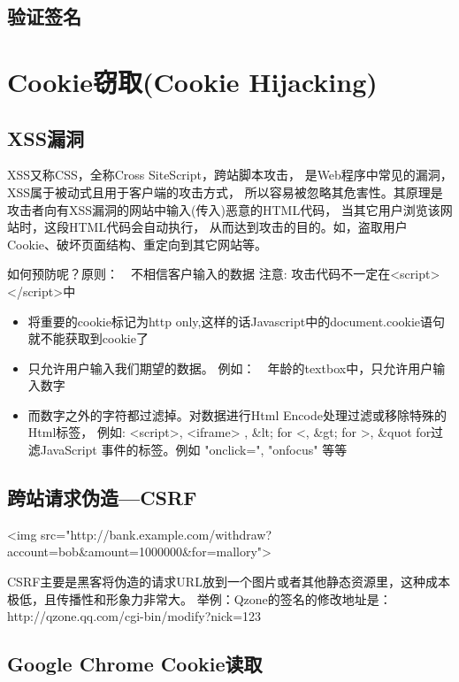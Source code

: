 \documentclass{book}
\begin{document}
\subsection{验证签名}


\section{Cookie窃取(Cookie Hijacking)}

\subsection{XSS漏洞}

XSS又称CSS，全称Cross SiteScript，跨站脚本攻击，
是Web程序中常见的漏洞，XSS属于被动式且用于客户端的攻击方式，
所以容易被忽略其危害性。其原理是攻击者向有XSS漏洞的网站中输入(传入)恶意的HTML代码，
当其它用户浏览该网站时，这段HTML代码会自动执行，
从而达到攻击的目的。如，盗取用户Cookie、破坏页面结构、重定向到其它网站等。

如何预防呢？原则：　不相信客户输入的数据
注意:  攻击代码不一定在<script></script>中

\begin{itemize}
\item{将重要的cookie标记为http only,这样的话Javascript中的document.cookie语句就不能获取到cookie了}
\item{只允许用户输入我们期望的数据。 例如：　年龄的textbox中，只允许用户输入数字}
\item{而数字之外的字符都过滤掉。对数据进行Html Encode处理过滤或移除特殊的Html标签，
例如: <script>, <iframe> , \&lt; for <, \&gt; for >, 
\&quot for过滤JavaScript 事件的标签。例如 "onclick=", "onfocus" 等等}
\end{itemize}

\subsection{跨站请求伪造—CSRF}

<img src="http://bank.example.com/withdraw?account=bob\&amount=1000000\&for=mallory">

CSRF主要是黑客将伪造的请求URL放到一个图片或者其他静态资源里，这种成本极低，且传播性和形象力非常大。
举例：Qzone的签名的修改地址是：http://qzone.qq.com/cgi-bin/modify?nick=123

\subsection{Google Chrome Cookie读取}
\end{document}
